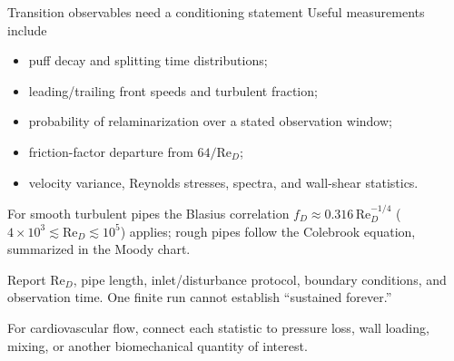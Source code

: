 \documentclass[aspectratio=169,11pt]{beamer}
\newcommand{\Rey}{\mathrm{Re}}
\begin{document}
\begin{frame}{Transition observables need a conditioning statement}
Useful measurements include
\begin{itemize}\itemsep5pt
  \item puff decay and splitting time distributions;
  \item leading/trailing front speeds and turbulent fraction;
  \item probability of relaminarization over a stated observation window;
  \item friction-factor departure from $64/\Rey_D$;
  \item velocity variance, Reynolds stresses, spectra, and wall-shear statistics.
\end{itemize}

For smooth turbulent pipes the Blasius correlation $f_D\approx0.316\,\Rey_D^{-1/4}$ ($4\times10^3\lesssim\Rey_D\lesssim10^5$) applies; rough pipes follow the Colebrook equation, summarized in the Moody chart.

\begin{punchbox}
Report $\Rey_D$, pipe length, inlet/disturbance protocol, boundary conditions, and observation time. One finite run cannot establish ``sustained forever.''
\end{punchbox}
\vspace{0.4em}

For cardiovascular flow, connect each statistic to pressure loss, wall loading, mixing, or another biomechanical quantity of interest.
\end{frame}
\end{document}
